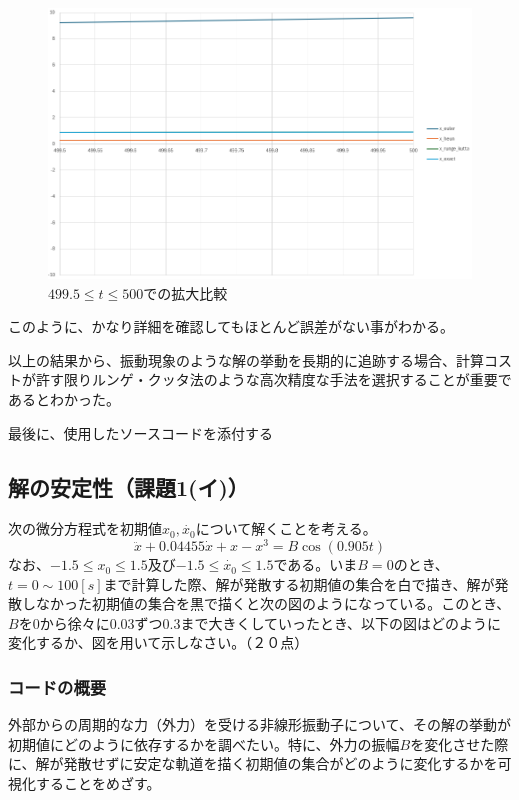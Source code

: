 \documentclass[dvipdfmx,a4paper]{jsarticle}
\begin{document}
\begin{figure}[H]
    \centering
    \includegraphics[width=0.5\linewidth]{summer/software-engineering/result_all_methods_02.png}
    \caption{$499.5\leq t \leq 500$での拡大比較}
    \label{fig:499.5-500}
\end{figure}
このように、かなり詳細を確認してもほとんど誤差がない事がわかる。

以上の結果から、振動現象のような解の挙動を長期的に追跡する場合、計算コストが許す限りルンゲ・クッタ法のような高次精度な手法を選択することが重要であるとわかった。

最後に、使用したソースコードを添付する


\subsection{解の安定性（課題1(イ)）}

次の微分方程式を初期値$x_0, \dot{x_0}$について解くことを考える。
$$\ddot{x}+ 0.04455\dot{x} + x − x^3 = B\cos(0.905t)$$
なお、$−1.5 \leq x_0 \leq 1.5$及び$−1.5 \leq \dot{x_0} \leq 1.5$である。いま$B=0$のとき、$t = 0 \sim 100 [s]$まで計算した際、解が発散する初期値の集合を白で描き、解が発散しなかった初期値の集合を黒で描くと次の図のようになっている。このとき、$B$を$0$から徐々に$0.03$ずつ$0.3$まで大きくしていったとき、以下の図はどのように変化するか、図を用いて示しなさい。（２０点）

\subsubsection{コードの概要}
外部からの周期的な力（外力）を受ける非線形振動子について、その解の挙動が初期値にどのように依存するかを調べたい。特に、外力の振幅$B$を変化させた際に、解が発散せずに安定な軌道を描く初期値の集合がどのように変化するかを可視化することをめざす。
\end{document}
